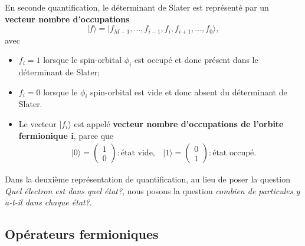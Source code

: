 En seconde quantification, le déterminant de Slater est représenté par
un \textbf{vecteur nombre d'occupations} 
\begin{equation}
|f\rangle =|f_{M-1},\dots,f_{i-1},f_i,f_{i+1},\dots, f_0\rangle, 
\end{equation} 
avec 
\begin{itemize}
\item $f_i=1$ lorsque le spin-orbital $\phi_i$ est
occupé et donc présent dans le déterminant de Slater; 
\item $f_i = 0$ lorsque le $\phi_i$ spin-orbital est vide et donc absent du
déterminant de Slater.
\item Le vecteur $|f_i\rangle$ est appelé \textbf{vecteur nombre
  d'occupations de l'orbite fermionique i}, parce que 
  \begin{align}
  &|0\rangle=\begin{pmatrix}1\\0\end{pmatrix}:\text{état vide}, & |1\rangle=\begin{pmatrix}0\\1\end{pmatrix}:\text{état occupé}.
  \end{align}
\end{itemize}

Dans la deuxième représentation de quantification, au lieu de poser la
question \emph{Quel électron est dans quel état?}, nous posons la
question \emph{combien de particules y a-t-il dans chaque état?}.

\hypertarget{opuxe9rateurs-fermioniques}{%
\subsection{Opérateurs
fermioniques}\label{opuxe9rateurs-fermioniques}}

